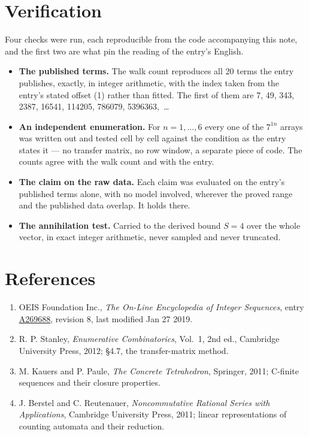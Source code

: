 \documentclass[11pt]{article}
\theoremstyle{definition}
\begin{document}
\section{Verification}

Four checks were run, each reproducible from the code accompanying this note, and the first two are what pin the reading of the entry's English.

\begin{itemize}

\item {\bfseries The published terms.} The walk count reproduces all 20 terms the entry publishes, exactly, in integer arithmetic, with the index taken from the entry's stated offset (1) rather than fitted. The first of them are 7, 49, 343, 2387, 16541, 114205, 786079, 5396363,~\dots

\item {\bfseries An independent enumeration.} For $n = 1,\dots,6$ every one of the $7^{1n}$ arrays was written out and tested cell by cell against the condition as the entry states it --- no transfer matrix, no row window, a separate piece of code. The counts agree with the walk count and with the entry.

\item {\bfseries The claim on the raw data.} Each claim was evaluated on the entry's published terms alone, with no model involved, wherever the proved range and the published data overlap. It holds there.

\item {\bfseries The annihilation test.} Carried to the derived bound $S = 4$ over the whole vector, in exact integer arithmetic, never sampled and never truncated.

\end{itemize}

\section{References}

\begin{enumerate}

\item OEIS Foundation Inc., \emph{The On-Line Encyclopedia of Integer Sequences}, entry \href{https://oeis.org/A269688}{A269688}, revision 8, last modified Jan 27 2019.

\item R. P. Stanley, \emph{Enumerative Combinatorics}, Vol.~1, 2nd ed., Cambridge University Press, 2012; \S4.7, the transfer-matrix method.

\item M. Kauers and P. Paule, \emph{The Concrete Tetrahedron}, Springer, 2011; C-finite sequences and their closure properties.

\item J. Berstel and C. Reutenauer, \emph{Noncommutative Rational Series with Applications}, Cambridge University Press, 2011; linear representations of counting automata and their reduction.

\end{enumerate}
\end{document}

